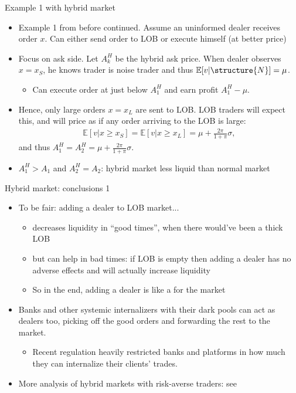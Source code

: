 \documentclass[english,10pt
,aspectratio=169
]{beamer}
\begin{document}
\begin{frame}{Example 1 with hybrid market}
	\begin{itemize}
		\item Example 1 from before continued. Assume an uninformed dealer receives order $x$. Can either send order to LOB or execute himself (at better price) 
		\pause
		\item Focus on ask side. Let $A^H_k$ be the hybrid ask price. When dealer observes $x=x_S$, he knows trader is noise trader and thus $\mathbb{E}[v|\structure{N}]=\mu$. 
		\begin{itemize}
			\item Can execute order at just below $A^H_1$ and earn profit $A^H_1-\mu$.
		\end{itemize}
		\pause
		\item Hence, only large orders $x=x_L$ are sent to LOB. LOB traders will expect this, and will price as if any order arriving to the LOB is large:
		\begin{align*}
			\mathbb{E}[v|x \ge x_S]=\mathbb{E}[v|x \ge x_L]=\mu+\frac{2\pi}{1+\pi} \sigma,
		\end{align*}
		and thus $A^H_1=A^H_2=\mu+\frac{2\pi}{1+\pi} \sigma$.
		\item $A^H_1>A_1$ and $A^H_2=A_2$: hybrid market less liquid than normal market 
	\end{itemize}
\end{frame}


\begin{frame}{Hybrid market: conclusions 1}
	\begin{itemize}
		\item To be fair: adding a dealer to LOB market... 
		\begin{itemize}
			\item decreases liquidity in ``good times'', when there would've been a thick LOB
			\item but can help in bad times: if LOB is empty then adding a dealer has no adverse effects and will actually increase liquidity
			\item So in the end, adding a dealer is like a  for the market
		\end{itemize}
		\item Banks and other systemic internalizers with their dark pools can act as dealers too, picking off the good orders and forwarding the rest to the market. 
		\begin{itemize}
			\item Recent regulation heavily restricted banks and platforms in how much they can internalize their clients' trades.
		\end{itemize}
		\item More analysis of hybrid markets with risk-averse traders: see \cite{viswanathan_market_2002} 
	\end{itemize}
\end{frame}
\end{document}
